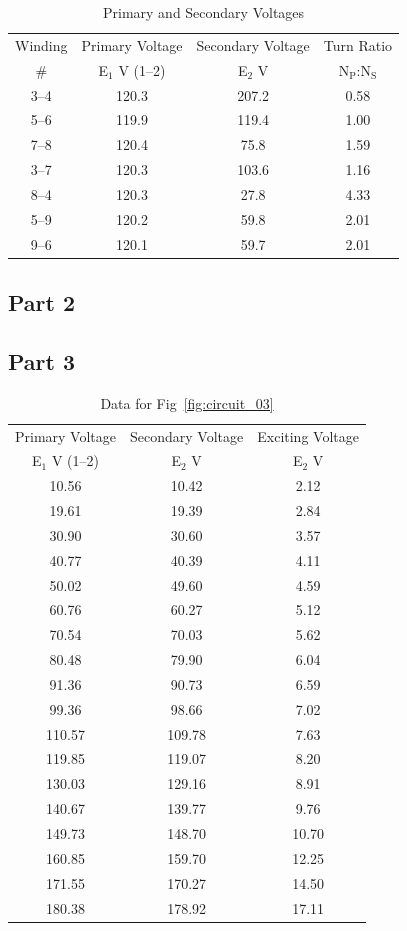 \documentclass{article}
\begin{document}
\begin{table}[h]
  \centering
  \begin{tabular}{cccc}
    \hline
    Winding & Primary Voltage & Secondary Voltage & Turn Ratio \\
    \# & E$_1$ V (1--2) & E$_2$ V & N$_\text{P}$:N$_\text{S}$\\
    \hline
    3--4 & 120.3 & 207.2 & 0.58 \\
    5--6 & 119.9 & 119.4 & 1.00 \\
    7--8 & 120.4 &  75.8 & 1.59 \\
    3--7 & 120.3 & 103.6 & 1.16 \\
    8--4 & 120.3 &  27.8 & 4.33 \\
    5--9 & 120.2 &  59.8 & 2.01 \\
    9--6 & 120.1 &  59.7 & 2.01 \\
  \end{tabular}
  \caption{Primary and Secondary Voltages}
  \label{tab:volt_rat}
\end{table}

\subsection{Part 2}

\subsection{Part 3}
\begin{table}[h]
  \centering
  \begin{tabular}{ccc}
    \hline
    Primary Voltage & Secondary Voltage & Exciting Voltage\\
    E$_1$ V (1--2) & E$_2$ V & E$_2$ V\\
    \hline
    10.56 &  10.42 &  2.12 \\
    19.61 &  19.39 &  2.84 \\
    30.90 &  30.60 &  3.57 \\
    40.77 &  40.39 &  4.11 \\
    50.02 &  49.60 &  4.59 \\
    60.76 &  60.27 &  5.12 \\
    70.54 &  70.03 &  5.62 \\
    80.48 &  79.90 &  6.04 \\
    91.36 &  90.73 &  6.59 \\
    99.36 &  98.66 &  7.02 \\
    110.57 & 109.78 &  7.63 \\
    119.85 & 119.07 &  8.20 \\
    130.03 & 129.16 &  8.91 \\
    140.67 & 139.77 &  9.76 \\
    149.73 & 148.70 & 10.70 \\
    160.85 & 159.70 & 12.25 \\
    171.55 & 170.27 & 14.50 \\
    180.38 & 178.92 & 17.11 \\
  \end{tabular}
  \caption{Data for Fig~\ref{fig:circuit_03}}
  \label{tab:circuit_3}
\end{table}
\end{document}
